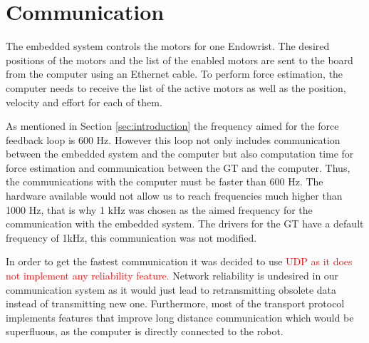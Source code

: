 \section{Communication}
The embedded system controls the motors for one Endowrist. The desired positions of the motors and the list of the enabled motors are sent to the board from the computer using an Ethernet cable. To perform force estimation, the computer needs to receive the list of the active motors as well as the position, velocity and effort for each of them.

As mentioned in Section \ref{sec:introduction} the frequency aimed for the force feedback loop is 600 Hz. However this loop not only includes communication between the embedded system and the computer but also computation time for force estimation and communication between the GT and the computer. Thus, the communications with the computer must be faster than 600 Hz. The hardware available would not allow us to reach frequencies much higher than 1000 Hz, that is why 1 kHz was chosen as the aimed frequency for the communication with the embedded system. The drivers for the GT have a default frequency of 1kHz, this communication was not modified.


In order to get the fastest communication it was decided to use \textcolor{red}{UDP as it does not implement any reliability feature.} Network reliability is undesired in our communication system as it would just lead to retransmitting obsolete data instead of transmitting new one. Furthermore, most of the transport protocol implements features that improve long distance communication which would be superfluous, as the computer is directly connected to the robot.
 
